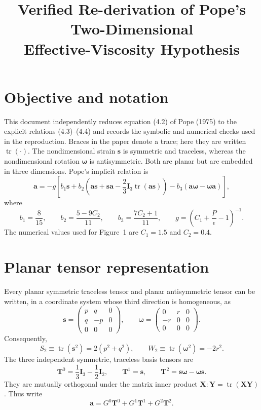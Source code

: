 \documentclass[11pt]{article}
\title{Verified Re-derivation of Pope's Two-Dimensional\\Effective-Viscosity Hypothesis}
\author{}
\date{}
\newcommand{\tr}[1]{\operatorname{tr}\!\left(#1\right)}
\newcommand{\bS}{\bm{s}}
\newcommand{\bW}{\bm{\omega}}
\newcommand{\bA}{\bm{a}}
\newcommand{\Ithree}{\bm{I}_3}
\newcommand{\Itwo}{\bm{I}_2}
\begin{document}
\maketitle

\section{Objective and notation}
This document independently reduces equation (4.2) of Pope (1975) to the explicit
relations (4.3)--(4.4) and records the symbolic and numerical checks used in the
reproduction.  Braces in the paper denote a trace; here they are written
$\tr{\cdot}$.  The nondimensional strain $\bS$ is symmetric and traceless,
whereas the nondimensional rotation $\bW$ is antisymmetric.  Both are planar
but are embedded in three dimensions.  Pope's implicit relation is
\begin{equation}
 \bA=-g\left[b_1\bS+b_2\left(\bA\bS+\bS\bA
 -\frac{2}{3}\Ithree\tr{\bA\bS}\right)
 -b_3(\bA\bW-\bW\bA)\right],
 \label{eq:implicit}
\end{equation}
where
\begin{equation}
 b_1=\frac{8}{15},\qquad b_2=\frac{5-9C_2}{11},\qquad
 b_3=\frac{7C_2+1}{11},\qquad
 g=\left(C_1+\frac{P}{\epsilon}-1\right)^{-1}.
 \label{eq:constants}
\end{equation}
The numerical values used for Figure~1 are $C_1=1.5$ and $C_2=0.4$.

\section{Planar tensor representation}
Every planar symmetric traceless tensor and planar antisymmetric tensor can be
written, in a coordinate system whose third direction is homogeneous, as
\begin{equation}
 \bS=\begin{pmatrix}p&q&0\\q&-p&0\\0&0&0\end{pmatrix},\qquad
 \bW=\begin{pmatrix}0&r&0\\-r&0&0\\0&0&0\end{pmatrix}.
 \label{eq:matrices}
\end{equation}
Consequently,
\begin{equation}
 S_2\equiv\tr{\bS^2}=2(p^2+q^2),\qquad
 W_2\equiv\tr{\bW^2}=-2r^2.
 \label{eq:invariants}
\end{equation}
The three independent symmetric, traceless basis tensors are
\begin{equation}
 \bm{T}^{0}=\frac{1}{3}\Ithree-\frac{1}{2}\Itwo,\qquad
 \bm{T}^{1}=\bS,\qquad
 \bm{T}^{2}=\bS\bW-\bW\bS.
 \label{eq:basis}
\end{equation}
They are mutually orthogonal under the matrix inner product
$\bm{X}:\bm{Y}=\tr{\bm{X}\bm{Y}}$.  Thus write
\begin{equation}
 \bA=G^0\bm{T}^0+G^1\bm{T}^1+G^2\bm{T}^2.
 \label{eq:expansion}
\end{equation}
\end{document}
